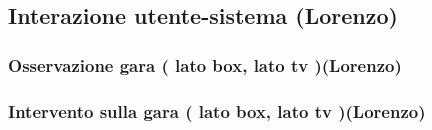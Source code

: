 \subsection{Interazione utente-sistema (Lorenzo)}
     \subsubsection{Osservazione gara ( lato box, lato tv )(Lorenzo)}
     \subsubsection{Intervento sulla gara ( lato box, lato tv )(Lorenzo)}